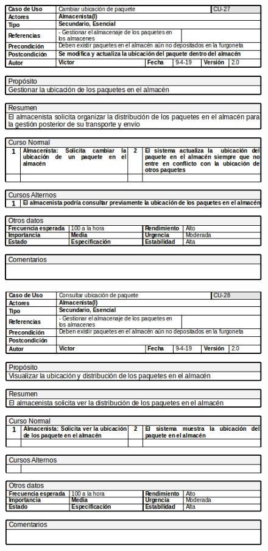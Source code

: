 \begin{figure}[H]
	\centering
	\includegraphics[width=16cm]{27}
\end{figure}
\begin{figure}[H]
	\centering
	\includegraphics[width=16cm]{28}
\end{figure}
